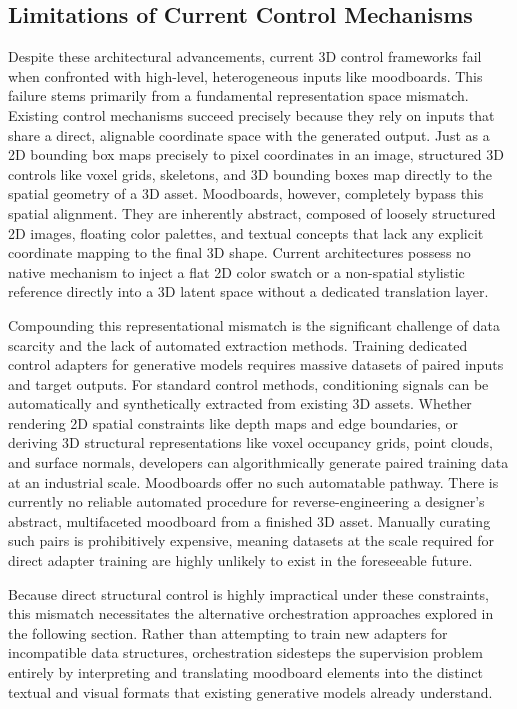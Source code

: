 \subsection{Limitations of Current Control Mechanisms}

Despite these architectural advancements, current 3D control frameworks fail when confronted with high-level, heterogeneous inputs like moodboards. This failure stems primarily from a fundamental representation space mismatch. Existing control mechanisms succeed precisely because they rely on inputs that share a direct, alignable coordinate space with the generated output. Just as a 2D bounding box maps precisely to pixel coordinates in an image, structured 3D controls like voxel grids, skeletons, and 3D bounding boxes map directly to the spatial geometry of a 3D asset. Moodboards, however, completely bypass this spatial alignment. They are inherently abstract, composed of loosely structured 2D images, floating color palettes, and textual concepts that lack any explicit coordinate mapping to the final 3D shape. Current architectures possess no native mechanism to inject a flat 2D color swatch or a non-spatial stylistic reference directly into a 3D latent space without a dedicated translation layer.

Compounding this representational mismatch is the significant challenge of data scarcity and the lack of automated extraction methods. Training dedicated control adapters for generative models requires massive datasets of paired inputs and target outputs. For standard control methods, conditioning signals can be automatically and synthetically extracted from existing 3D assets. Whether rendering 2D spatial constraints like depth maps and edge boundaries, or deriving 3D structural representations like voxel occupancy grids, point clouds, and surface normals, developers can algorithmically generate paired training data at an industrial scale. Moodboards offer no such automatable pathway. There is currently no reliable automated procedure for reverse-engineering a designer's abstract, multifaceted moodboard from a finished 3D asset. Manually curating such pairs is prohibitively expensive, meaning datasets at the scale required for direct adapter training are highly unlikely to exist in the foreseeable future. 

Because direct structural control is highly impractical under these constraints, this mismatch necessitates the alternative orchestration approaches explored in the following section. Rather than attempting to train new adapters for incompatible data structures, orchestration sidesteps the supervision problem entirely by interpreting and translating moodboard elements into the distinct textual and visual formats that existing generative models already understand.

